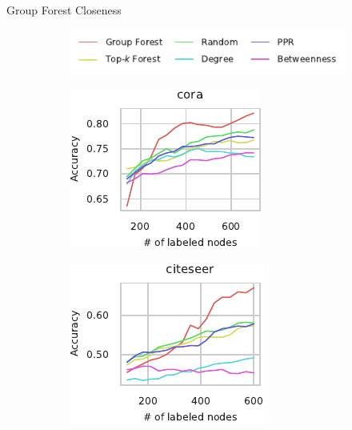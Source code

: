 \documentclass[10pt,titlepage,english,presentation]{beamer}
\begin{document}
\begin{frame}[t]{Group Forest Closeness}
\begin{figure}
\begin{subfigure}[t]{\textwidth}
\centering
\includegraphics[width=.4\textwidth]{../sources/plots/el-clos/legend-node-class.pdf}
\end{subfigure}

\begin{subfigure}[t]{.5\textwidth}
\centering
\includegraphics[width=.6\textwidth]{../sources/plots/el-clos/node-class-cora.pdf}
\end{subfigure}\hfill
\begin{subfigure}[t]{.5\textwidth}
\centering
\includegraphics[width=.6\textwidth]{../sources/plots/el-clos/node-class-citeseer.pdf}
\end{subfigure}\smallskip


\end{figure}
\end{frame}
\end{document}
